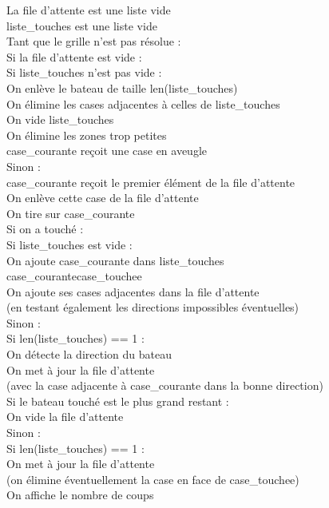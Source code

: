 \begin{algo1}
La file d'attente est une liste vide\\
liste\_touches est une liste vide\\
Tant que le grille n'est pas résolue :\\
Si la file d'attente est vide :\\
Si liste\_touches n'est pas vide :\\
On enlève le bateau de taille len(liste\_touches)\\
On élimine les cases adjacentes à celles de liste\_touches\\
On vide liste\_touches\\
On élimine les zones trop petites\\
case\_courante reçoit une case en aveugle\\
Sinon :\\
case\_courante reçoit le premier élément de la file d'attente\\
On enlève cette case de la file d'attente\\
On tire sur case\_courante\\
Si on a touché :\\
Si liste\_touches est vide :\\
On ajoute case\_courante dans liste\_touches\\
case\_courante\sto case\_touchee\\
On ajoute ses cases adjacentes dans la file d'attente\\
(en testant également les directions impossibles éventuelles)\\
Sinon :\\
Si len(liste\_touches) == 1 :\\
On détecte la direction du bateau\\
On met à jour la file d'attente\\
(avec la case adjacente à case\_courante dans la bonne direction)\\
Si le bateau touché est le plus grand restant :\\
On vide la file d'attente\\
Sinon :\\
Si len(liste\_touches) == 1 :\\
On met à jour la file d'attente\\
(on élimine éventuellement la case en face de case\_touchee)\\
On affiche le nombre de coups\\
\end{algo1}

